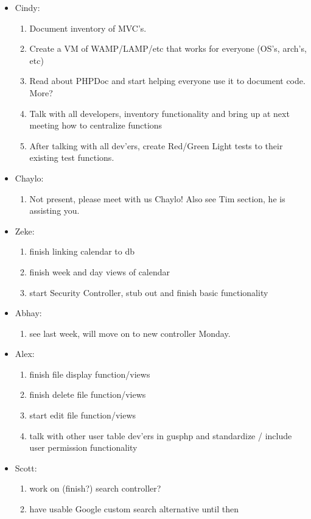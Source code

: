 \documentclass[12pt]{article}
\begin{document}
\begin{itemize}
\item Cindy:
\begin{enumerate}
 \item Document inventory of MVC's.
 \item Create a VM of WAMP/LAMP/etc that works for everyone (OS's, arch's, etc)
 \item Read about PHPDoc and start helping everyone use it to document code. More?
 \item Talk with all developers, inventory functionality and bring up at next meeting how to centralize functions
 \item After talking with all dev'ers, create Red/Green Light tests to their existing test functions.
\end{enumerate}
\item Chaylo:
\begin{enumerate}
 \item Not present, please meet with us Chaylo! Also see Tim section, he is assisting you.
\end{enumerate}
\item Zeke:
\begin{enumerate}
 \item finish linking calendar to db
 \item finish week and day views of calendar
 \item start Security Controller, stub out and finish basic functionality
\end{enumerate}
\item Abhay:
\begin{enumerate}
 \item see last week, will move on to new controller Monday.
\end{enumerate}
\item Alex:
\begin{enumerate}
 \item finish file display function/views
 \item finish delete file function/views
 \item start edit file function/views
 \item talk with other user table dev'ers in gusphp and standardize / include user permission functionality
\end{enumerate}
\item Scott:
\begin{enumerate}
 \item work on (finish?) search controller?
 \item have usable Google custom search alternative until then

\end{enumerate}
\end{itemize}
\end{document}
